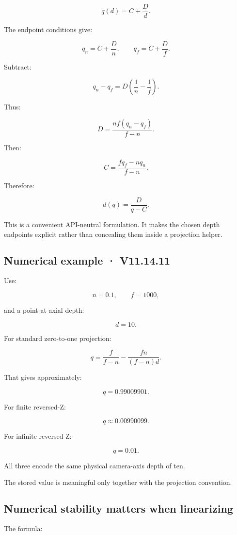 \[ q(d)=C+\frac Dd. \]

The endpoint conditions give:

\[ q_n=C+\frac Dn, \qquad q_f=C+\frac Df. \]

Subtract:

\[ q_n-q_f=D\left(\frac1n-\frac1f\right). \]

Thus:

\[ \boxed{ D=\frac{nf(q_n-q_f)}{f-n}. } \]

Then:

\[ \boxed{ C=\frac{fq_f-nq_n}{f-n}. } \]

Therefore:

\[ \boxed{ d(q)=\frac D{q-C}. } \]

This is a convenient API-neutral formulation. It makes the chosen depth endpoints explicit rather than concealing them inside a projection helper.

\subsection{Numerical example · V11.14.11}\label{02-foundations-ii-ch035-numerical-example-v11.14.11}

Use:

\[ n=0.1,\qquad f=1000, \]

and a point at axial depth:

\[ d=10. \]

For standard zero-to-one projection:

\[ q=\frac f{f-n}-\frac{fn}{(f-n)d}. \]

That gives approximately:

\[ \boxed{q=0.99009901}. \]

For finite reversed-Z:

\[ \boxed{q\approx0.00990099}. \]

For infinite reversed-Z:

\[ \boxed{q=0.01}. \]

All three encode the same physical camera-axis depth of ten.

The stored value is meaningful only together with the projection convention.

\subsection{Numerical stability matters when linearizing}\label{02-foundations-ii-ch035-numerical-stability-matters-when-linearizing}

The formula:

